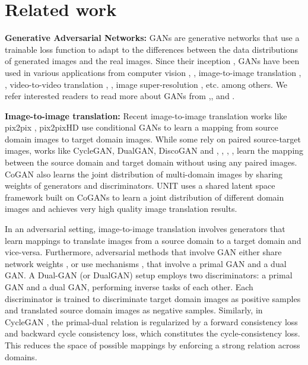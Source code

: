 \documentclass[a4paper,twoside]{article}
\begin{document}
\section{Related work}
\noindent \textbf{Generative Adversarial Networks:} GANs are generative networks that use a trainable loss function to adapt to the differences between the data distributions of generated images and the real images. Since their inception \cite{Goodfellow_2014_NIPS} \cite{radford2015GAN}, GANs have been used in various applications from computer vision \cite{DBLP:journals/corr/MaNIPS17}, \cite{DBLP:journals/corr/VondrickNIPS16}, image-to-image translation \cite{TaigmanICLR17}, \cite{TungAIGNICCV17}, video-to-video translation \cite{Fewshotvid2vid}, \cite{wang2018vid2vid}, image super-resolution \cite{DBLP:journals/corr/LedigCVPR17}, etc. among others. We refer interested readers to read more about GANs from \cite{Creswell_2018},\cite{jabbar2020survey}, \cite{DBLP:journals/corr/Kurach18} and \cite{wang2020generative}.

\noindent
\textbf{Image-to-image translation:} Recent image-to-image translation works like pix2pix \cite{pix2pix_isola2017}, pix2pixHD \cite{pix2pixHD_wang2018} use conditional GANs to learn a mapping from source domain images to target domain images.  While some rely on paired source-target images, works like CycleGAN, DualGAN, DiscoGAN \cite{DiscoGAN_KimCKLK17} and \cite{TungAIGNICCV17}, \cite{TaigmanICLR17}, \cite{CoGAN_0001T16}, \cite{UNIT_LiuBK17}, \cite{BousmalisSDEK16} learn the mapping between the source domain and target domain without using any paired images. CoGAN \cite{CoGAN_0001T16} also learns the joint distribution of multi-domain images by sharing weights of generators and discriminators. UNIT \cite{UNIT_LiuBK17} uses a shared latent space framework built on CoGANs to learn a joint distribution of different domain images and achieves very high quality image translation results.
\par

In an adversarial setting, image-to-image translation involves generators that learn mappings to translate images from a source domain to a target domain and vice-versa. Furthermore, adversarial methods that involve GAN either share network weights \cite{CoGAN_0001T16}, \cite{talreja2019AGCoGAN} or use mechanisms \cite{DualGAN_YiZTG17}, \cite{CycleGAN2017} that involve a primal GAN and a dual GAN. A Dual-GAN (or DualGAN) \cite{DualGAN_YiZTG17} setup employs two discriminators: a primal GAN and a dual GAN, performing inverse tasks of each other. Each discriminator is trained to discriminate target domain images as positive samples and translated source domain images as negative samples. Similarly, in CycleGAN \cite{CycleGAN2017}, the primal-dual relation is regularized by a forward consistency loss and backward cycle consistency loss, which constitutes the cycle-consistency loss. This reduces the space of possible mappings by enforcing a strong relation across domains.
\end{document}
